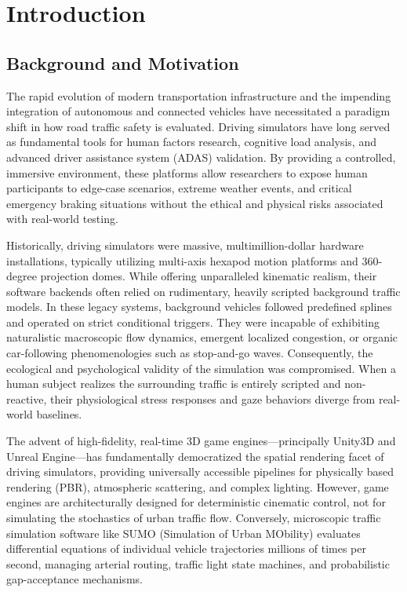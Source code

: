 \chapter{Introduction}

\section{Background and Motivation}

The rapid evolution of modern transportation infrastructure and the impending integration of autonomous and connected vehicles have necessitated a paradigm shift in how road traffic safety is evaluated. Driving simulators have long served as fundamental tools for human factors research, cognitive load analysis, and advanced driver assistance system (ADAS) validation. By providing a controlled, immersive environment, these platforms allow researchers to expose human participants to edge-case scenarios, extreme weather events, and critical emergency braking situations without the ethical and physical risks associated with real-world testing. 

Historically, driving simulators were massive, multimillion-dollar hardware installations, typically utilizing multi-axis hexapod motion platforms and 360-degree projection domes. While offering unparalleled kinematic realism, their software backends often relied on rudimentary, heavily scripted background traffic models. In these legacy systems, background vehicles followed predefined splines and operated on strict conditional triggers. They were incapable of exhibiting naturalistic macroscopic flow dynamics, emergent localized congestion, or organic car-following phenomenologies such as stop-and-go waves. Consequently, the ecological and psychological validity of the simulation was compromised. When a human subject realizes the surrounding traffic is entirely scripted and non-reactive, their physiological stress responses and gaze behaviors diverge from real-world baselines.

The advent of high-fidelity, real-time 3D game engines—principally Unity3D and Unreal Engine—has fundamentally democratized the spatial rendering facet of driving simulators, providing universally accessible pipelines for physically based rendering (PBR), atmospheric scattering, and complex lighting. However, game engines are architecturally designed for deterministic cinematic control, not for simulating the stochastics of urban traffic flow. Conversely, microscopic traffic simulation software like SUMO (Simulation of Urban MObility) evaluates differential equations of individual vehicle trajectories millions of times per second, managing arterial routing, traffic light state machines, and probabilistic gap-acceptance mechanisms. 

